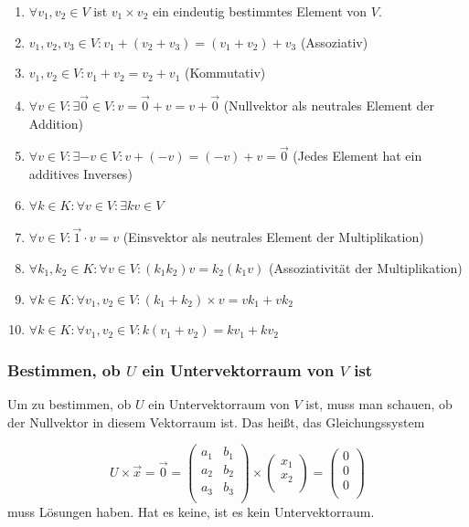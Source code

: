 \documentclass{scrartcl}
\begin{document}
\begin{enumerate}
	\item $\forall v_1, v_2 \in V$ ist $v_1 \times v_2$ ein eindeutig bestimmtes Element von $V$.
	\item $v_1, v_2, v_3 \in V: v_1 + (v_2 + v_3) = (v_1 + v_2) + v_3$ (Assoziativ)
	\item $v_1, v_2 \in V: v_1 + v_2 = v_2 + v_1$ (Kommutativ)
	\item $\forall v \in V: \exists \vec{0} \in V: v = \vec{0} + v = v + \vec{0}$ (Nullvektor als neutrales Element der Addition)
	\item $\forall v \in V: \exists -v \in V: v + (-v) = (-v) + v = \vec{0}$ (Jedes Element hat ein additives Inverses)
	\item $\forall k \in K: \forall v \in V: \exists kv \in V$
	\item $\forall v \in V: \vec{1}\cdot v = v$ (Einsvektor als neutrales Element der Multiplikation)
	\item $\forall k_1, k_2 \in K: \forall v \in V: (k_1k_2)v = k_2(k_1v)$ (Assoziativität der Multiplikation)
	\item $\forall k \in K: \forall v_1, v_2 \in V: (k_1 + k_2) \times v = vk_1 + vk_2$
	\item $\forall k \in K: \forall v_1, v_2 \in V: k(v_1 + v_2) = kv_1 + kv_2$
\end{enumerate}

\subsubsection{Bestimmen, ob $U$ ein Untervektorraum von $V$ ist}

Um zu bestimmen, ob $U$ ein Untervektorraum von $V$ ist, muss man schauen, ob der Nullvektor in diesem Vektorraum ist.
Das heißt, das Gleichungssystem

\begin{equation}
	U\times\vec{x} = \vec{0} =
	\begin{pmatrix*}
		a_1 & b_1 \\
		a_2 & b_2 \\
		a_3 & b_3 \\
	\end{pmatrix*} \times \begin{pmatrix*}
		x_1 \\
		x_2 \\
	\end{pmatrix*} = \begin{pmatrix*}
		0 \\
		0 \\
		0 \\
	\end{pmatrix*}
\end{equation}
muss Lösungen haben. Hat es keine, ist es kein Untervektorraum.
\end{document}
